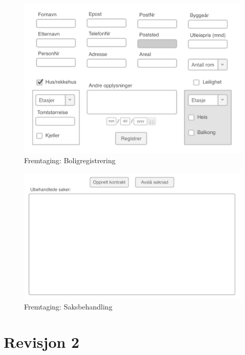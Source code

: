 \begin{figure}[ht]
 \includegraphics[width=\textwidth,height=\textheight,keepaspectratio]{./img/appendix/gui_forslag/rev_1/RegBolig.png}
 \caption{Fremtaging: Boligregistrering}
 \label{fig:DEV:RegBolig}
\end{figure}

\begin{figure}[ht]
 \includegraphics[width=\textwidth,height=\textheight,keepaspectratio]{./img/appendix/gui_forslag/rev_1/Saksbehandling.png}
 \caption{Fremtaging: Saksbehandling}
 \label{fig:DEV:Saksbehandling}
\end{figure}



\section{Revisjon 2}

